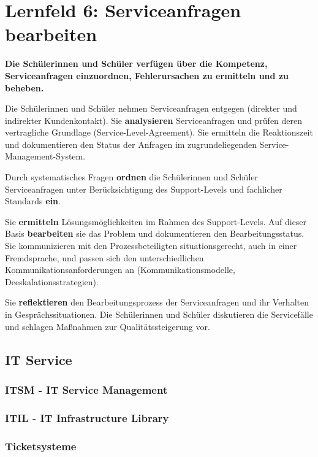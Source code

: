 \chapter{Lernfeld 6: Serviceanfragen bearbeiten}

\textbf{Die Schülerinnen und Schüler verfügen über die Kompetenz, Serviceanfragen einzuordnen, Fehlerursachen zu ermitteln und zu beheben.}

Die Schülerinnen und Schüler nehmen Serviceanfragen entgegen (direkter und indirekter
Kundenkontakt). Sie \textbf{analysieren} Serviceanfragen und prüfen deren vertragliche Grundlage
(Service-Level-Agreement). Sie ermitteln die Reaktionszeit und dokumentieren den Status
der Anfragen im zugrundeliegenden Service-Management-System.

Durch systematisches Fragen \textbf{ordnen} die Schülerinnen und Schüler Serviceanfragen unter
Berücksichtigung des Support-Levels und fachlicher Standards \textbf{ein}.

Sie \textbf{ermitteln} Lösungsmöglichkeiten im Rahmen des Support-Levels. Auf dieser Basis \textbf{bearbeiten} sie das Problem und dokumentieren den Bearbeitungsstatus. Sie kommunizieren
mit den Prozessbeteiligten situationsgerecht, auch in einer Fremdsprache, und passen sich
den unterschiedlichen Kommunikationsanforderungen an (Kommunikationsmodelle, Deeskalationsstrategien).

Sie \textbf{reflektieren} den Bearbeitungsprozess der Serviceanfragen und ihr Verhalten in Gesprächssituationen. Die Schülerinnen und Schüler diskutieren die Servicefälle und schlagen
Maßnahmen zur Qualitätssteigerung vor.

\section{IT Service}

\subsection{ITSM - IT Service Management}

\subsection{ITIL - IT Infrastructure Library}

\subsection{Ticketsysteme}

